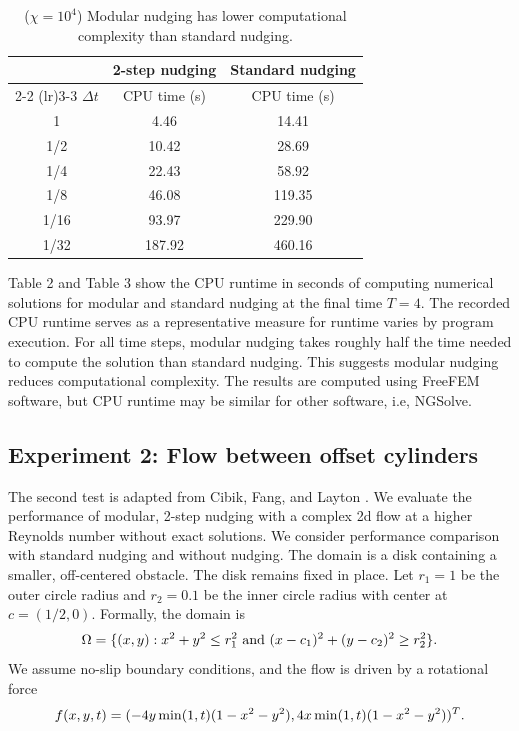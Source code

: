 \documentclass[11pt,a4paper]{article}
\begin{document}
\begin{table}[H]
\centering
\begin{tabular}{||c|c|c||}
\toprule
 & \multicolumn{1}{c|}{2-step nudging}
 & \multicolumn{1}{c||}{Standard nudging} \\
\cmidrule(lr){2-2} \cmidrule(lr){3-3}
$\Delta t$
& CPU time (s)
& CPU time (s) \\
\midrule
1     & 4.46 & 14.41 \\
1/2   & 10.42 & 28.69 \\
1/4   & 22.43 & 58.92 \\
1/8   & 46.08 & 119.35 \\
1/16  & 93.97 & 229.90 \\
1/32  & 187.92 & 460.16 \\
\bottomrule
\end{tabular}
\caption{($\chi=10^4$) Modular
nudging has lower computational complexity than standard nudging.}
\end{table}

Table 2 and Table 3 show the CPU runtime in seconds of computing numerical solutions for modular and standard nudging at the final time $T=4$. The recorded CPU runtime serves as a representative measure for runtime varies by program execution. For all time steps, modular nudging takes roughly half the time needed to compute the solution than standard nudging. This suggests modular nudging reduces computational complexity. The results are computed using FreeFEM software, but CPU runtime may be similar for other software, i.e, NGSolve. 

\subsection{Experiment 2: Flow between offset cylinders}
The second test is adapted from Cibik, Fang, and Layton \cite{Fang:2025}. We evaluate the performance of modular, 2-step nudging with a complex 2d flow at a higher Reynolds number without exact solutions. We consider performance comparison with standard nudging and without nudging. The domain is a disk containing a smaller, off-centered obstacle. The disk remains fixed in place. Let $r_1=1$ be the outer circle radius and $r_2=0.1$ be the inner circle radius with center at $c=(1/2,0)$. Formally, the domain is
\begin{align}
    \Omega=\{(x,y):x^2+y^2\leq r_1^2 \text{ and } (x-c_1)^2+(y-c_2)^2\geq r_2^2\}. \notag
\end{align}
We assume no-slip boundary conditions, and the flow is driven by a rotational force
\begin{align}
    f(x,y,t)=(-4y\min(1,t)(1-x^2-y^2), 4x\min(1,t)(1-x^2-y^2))^T. \notag
\end{align}
\end{document}
